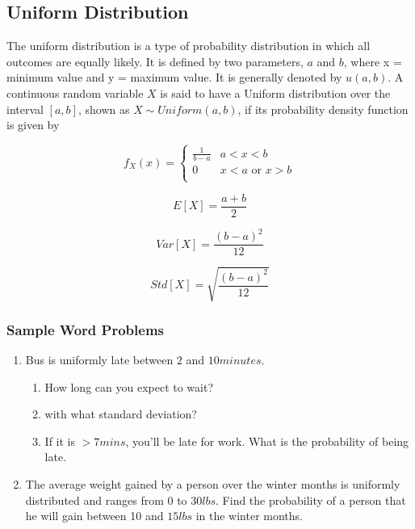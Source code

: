\documentclass[a4paper]{article}
\begin{document}
    \subsection{Uniform Distribution}
    The uniform distribution is a type of probability distribution in which all outcomes are equally likely. It is defined by two parameters, $a$ and $b$, where x = minimum value and y = maximum value. It is generally denoted by $u(a, b)$. A continuous random variable $X$ is said to have a Uniform distribution over the interval $[a,b]$, shown as $X \sim Uniform(a,b)$, if its probability density function is given by

    \begin{equation}
        \label{eq:uniform_pdf}
        f_X(x) = \left\{
        \begin{array}{ll}
            \frac{1}{b-a}  & a < x < b \\
            0 & {x < a \mbox{ or } x > b}\\
        \end{array}
    \right.
    \end{equation}

    \begin{equation}
        \label{eq:uniform_mean}
        E[X] = \frac{a+b}{2}
    \end{equation}

    \begin{equation}
        \label{eq:uniform_variance}
        Var[X] = \frac{{(b-a)}^2}{12}
    \end{equation}

    \begin{equation}
        \label{eq:uniform_std}
        Std[X] = \sqrt{\frac{{(b-a)}^2}{12}}
    \end{equation}

    \subsubsection*{Sample Word Problems}
    \begin{enumerate}
        \item Bus is uniformly late between $2$ and $10 minutes$.
            \begin{enumerate}
                \item How long can you expect to wait?
                \item with what standard deviation?
                \item If it is $> 7 mins$, you'll be late for work. What is the probability of being late.
            \end{enumerate}
        \item The average weight gained by a person over the winter months is uniformly distributed and ranges from $0$ to $30 lbs$. Find the probability of a person that he will gain between 10 and $15lbs$ in the winter months.
    \end{enumerate}
\end{document}
